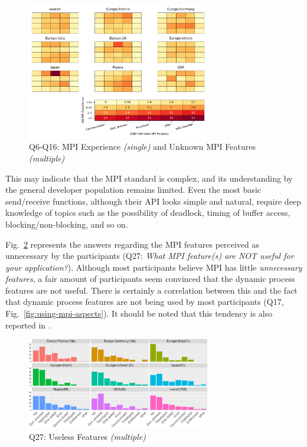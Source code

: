 \documentclass[preprint,5p,times]{elsarticle}
\def\myquote#1{{\it #1}}
\begin{document}
\begin{figure}[tb]
  \begin{center}
    \includegraphics[width=8.0cm]{Figs/Q6-Q16.pdf}
    \vspace{-1.5mm}
    \caption{Q6-Q16: MPI Experience {\it(single)} and Unknown MPI Features {\it(multiple)}}
    \label{fig:experience-and-aspects}
\vspace{-3mm}%
  \end{center}
\end{figure}

This may indicate that the MPI standard is complex, and its understanding by the
general developer population remains limited. Even the most basic send/receive
functions, although their API looks simple and natural, require deep knowledge
of topics such as the possibility of deadlock, timing of buffer access, blocking/non-blocking,
and so on.

Fig.~\ref{fig:useless-features} represents the answers regarding the MPI features
perceived as unnecessary by the participants (Q27: \myquote{What MPI feature(s)
are NOT useful for your application?}). Although most participants believe MPI
has little {\it unnecessary features}, a fair amount of participants seem
convinced that the dynamic process features are not useful. There is certainly a
correlation between this and the fact that dynamic process features are not being
used by most participants (Q17, Fig.~\ref{fig:using-mpi-aspects}). It should
be noted that this tendency is also reported in \cite{10.1145/3295500.3356176}.

\begin{figure}[tb]
  \begin{center}
    \includegraphics[width=8.0cm]{R-scripts/Q27.pdf}
    \vspace{-1.5mm}
    \caption{Q27: Useless Features {\it(multiple)}}
    \label{fig:useless-features}
\vspace{-3mm}%
  \end{center}
\end{figure}
\end{document}
